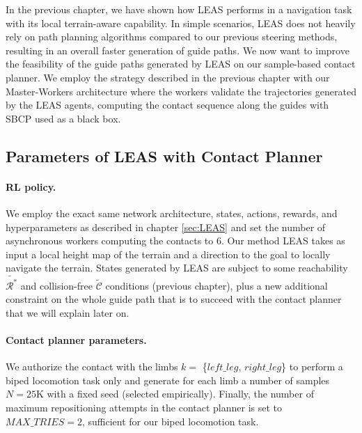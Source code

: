In the previous chapter, we have shown how LEAS performs in a navigation task with its local terrain-aware capability.
In simple scenarios, LEAS does not heavily rely on path planning algorithms compared to our previous steering methods, resulting in an overall faster generation of guide paths.
We now want to improve the feasibility of the guide paths generated by LEAS on our sample-based contact planner.
We employ the strategy described in the previous chapter with our Master-Workers architecture where the workers validate the trajectories generated by the LEAS agents, computing the contact sequence along the guides with SBCP used as a black box.

\subsection{Parameters of LEAS with Contact Planner}
\paragraph{RL policy.}
We employ the exact same network architecture, states, actions, rewards, and hyperparameters as described in chapter \ref{sec:LEAS} and set the number of asynchronous workers computing the contacts to 6.
Our method LEAS takes as input a local height map of the terrain and a direction to the goal to locally navigate the terrain. 
States generated by LEAS are subject to some reachability $\tilde{\mathcal{R}^*}$ and collision-free $\tilde{\mathcal{C}}$ conditions (previous chapter), plus a new additional constraint on the whole guide path that is to succeed with the contact planner that we will explain later on.

\paragraph{Contact planner parameters.}
We authorize the contact with the limbs $k=$ \{$left\_leg$, $right\_leg$\} to perform a biped locomotion task only and generate for each limb a number of samples $N=25$K with a fixed seed (selected empirically). Finally, the number of maximum repositioning attempts in the contact planner is set to $MAX\_TRIES=2$, sufficient for our biped locomotion task.

